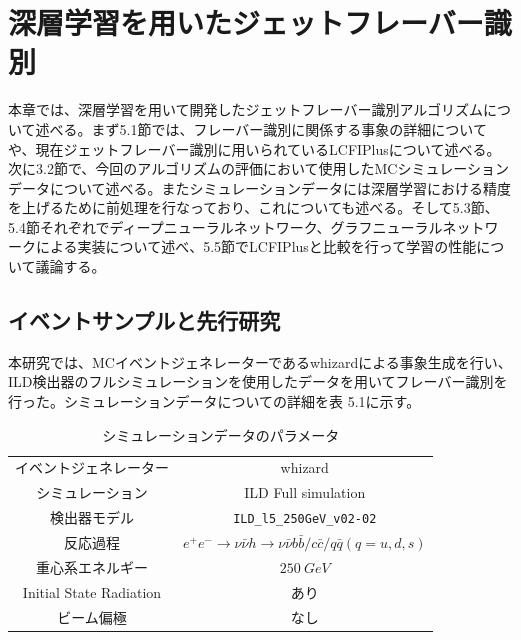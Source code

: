 


\chapter{深層学習を用いたジェットフレーバー識別} \label{sec:Flavortagging}
本章では、深層学習を用いて開発したジェットフレーバー識別アルゴリズムについて述べる。まず5.1節では、フレーバー識別に関係する事象の詳細についてや、現在ジェットフレーバー識別に用いられているLCFIPlusについて述べる。次に3.2節で、今回のアルゴリズムの評価において使用したMCシミュレーションデータについて述べる。またシミュレーションデータには深層学習における精度を上げるために前処理を行なっており、これについても述べる。そして5.3節、5.4節それぞれでディープニューラルネットワーク、グラフニューラルネットワークによる実装について述べ、5.5節でLCFIPlusと比較を行って学習の性能について議論する。
\section{イベントサンプルと先行研究}
本研究では、MCイベントジェネレーターであるwhizardによる事象生成を行い、ILD検出器のフルシミュレーションを使用したデータを用いてフレーバー識別を行った。シミュレーションデータについての詳細を表 5.1に示す。
\begin{table}[H]
 \centering
 \begin{tabular}{ c c }
 \hline
 イベントジェネレーター & whizard\\
 シミュレーション & ILD Full simulation\\
 検出器モデル & \texttt{ILD\_l5\_250GeV\_v02-02}\\
 反応過程 & $e^+e^- \rightarrow \nu \bar{\nu} h \rightarrow \nu \bar{\nu} b \bar{b} / c \bar{c} / q \bar{q} (q = u,d,s)$\\
 重心系エネルギー & $\SI{250}{GeV}$ \\
Initial State Radiation & あり\\
 ビーム偏極 & なし\\
 \hline
  \end{tabular}
  \caption{シミュレーションデータのパラメータ}
\end{table}
